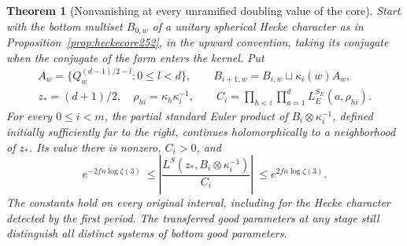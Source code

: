\documentclass[a4paper,11pt]{article}
\newtheorem{theorem}[proposition]{Theorem}
\theoremstyle{definition}
\theoremstyle{remark}
\numberwithin{equation}{section}
\begin{document}
\begin{theorem}[Nonvanishing at every unramified doubling value of the core]
\label{thm:coreeuler252}
Start with the bottom multiset \(B_{0,w}\) of a unitary spherical
Hecke character as in Proposition~\ref{prop:heckecore252}, in the
upward convention, taking its conjugate when the conjugate of the
form enters the kernel. Put
\[
 \begin{gathered}
 A_w=\{Q_w^{(d-1)/2-l}:0\le l<d\},\qquad
 B_{i+1,w}=B_{i,w}\sqcup\kappa_i(w) A_w,\\
 z_*=(d+1)/2,\quad \rho_{hi}=\kappa_h\kappa_i^{-1},\qquad
 C_i=\prod_{h<i}\prod_{a=1}^d L_E^{S_E}(a,\rho_{hi}).
 \end{gathered}
\]
For every \(0\le i<m\), the partial standard Euler product of
\(B_i\otimes\kappa_i^{-1}\), defined initially sufficiently far to the
right, continues holomorphically to a neighborhood of \(z_*\). Its
value there is nonzero, \(C_i>0\), and
\[
 e^{-2fn\log\zeta(3)}\ \le
 \left|\frac{L^{S}(z_*,B_i\otimes\kappa_i^{-1})}{C_i}\right|
 \ \le e^{2fn\log\zeta(3)} .
\]
The constants hold on every original interval, including for the
Hecke character detected by the first period. The transferred good
parameters at any stage still distinguish all distinct systems of
bottom good parameters.
\end{theorem}
\end{document}

